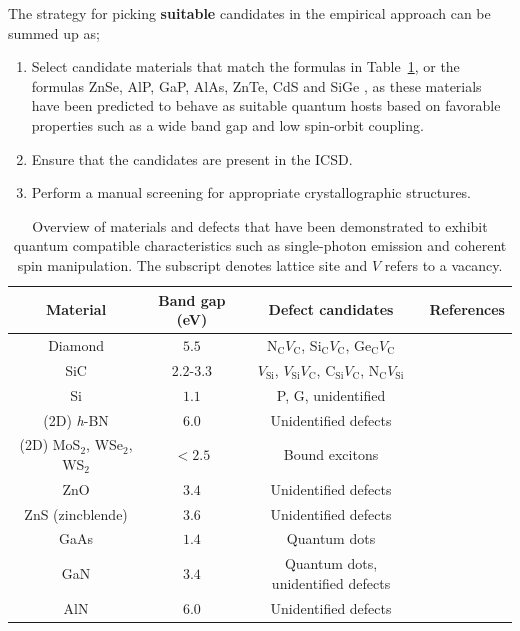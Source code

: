 \documentclass[superscriptaddress,unsortedaddress,
 amsmath,amssymb,
 aps,
]{revtex4-2}
\begin{document}
The strategy for picking \textbf{suitable} candidates in the empirical approach can be summed up as;  
\begin{enumerate}
    \item Select candidate materials that match the formulas in  Table~\ref{tab:qt-materials}, or the formulas ZnSe, AlP, GaP, AlAs, ZnTe, CdS \cite{Weber2010} and SiGe \cite{Hardy2019}, as these materials have been predicted to behave as suitable quantum hosts based on favorable properties such as a wide band gap and low spin-orbit coupling.  
    \item Ensure that the candidates are present in the ICSD.  
    \item Perform a manual screening for appropriate crystallographic structures. 
\end{enumerate}

\begin{table}[t]
    \centering 
    \caption{Overview of materials and defects that have been demonstrated to exhibit quantum  compatible characteristics such as single-photon emission and coherent spin manipulation. The subscript denotes lattice site and $V$ refers to a vacancy. }
    \begin{tabular}{c|c|c|c}
    Material & Band gap (\si{\electronvolt}) & Defect candidates & References \\
    \hline
    Diamond  & $5.5$  & N$_\mathrm{C}V_\mathrm{C}$, Si$_\mathrm{C}V_\mathrm{C}$, Ge$_\mathrm{C}V_\mathrm{C}$ & \cite{Taylor2008,Balasubramanian_2009,Barclay2011,Gordon2013,Rogers_2014,Bhaskar_2018} \\ 
    SiC & $2.2$-$3.3$ & $V_\mathrm{Si}$, $V_\mathrm{Si}V_\mathrm{C}$, C$_\mathrm{Si}V_\mathrm{C}$, N$_\mathrm{C}V_\mathrm{Si}$ & \cite{Widmann2014,Christle_2015,Castelletto_2014,Zargaleh_2018}  \cite{Weber2010, Son2020, Falk2013} \\ 
    Si & $1.1$ & P, G, unidentified & \cite{Muhonen_2014,Durand_2020,Redjem2020} \\ 
    (2D) \textit{h}-BN & $6.0$ & Unidentified defects & \cite{Tran_2016,Tran_2016b,Hayee_2020} \\ 
    (2D) MoS$_2$, WSe$_2$, WS$_2$ & $<2.5$ & Bound excitons & \cite{Toth2019} \\
    ZnO & $3.4$ & Unidentified defects & \cite{Morfa2012} \\ 
    ZnS (zincblende) & $3.6$ & Unidentified defects & \cite{Stewart2019} \\ 
    GaAs & $1.4$ & Quantum dots & \cite{Bluhm2010} \\ 
    GaN & $3.4$ & Quantum dots, unidentified defects & \cite{Roux2017,Berhane2018} \\
    AlN & $6.0$ & Unidentified defects & \cite{Xue2020}\\
    \end{tabular}
    \label{tab:qt-materials}
\end{table} 
\end{document}
